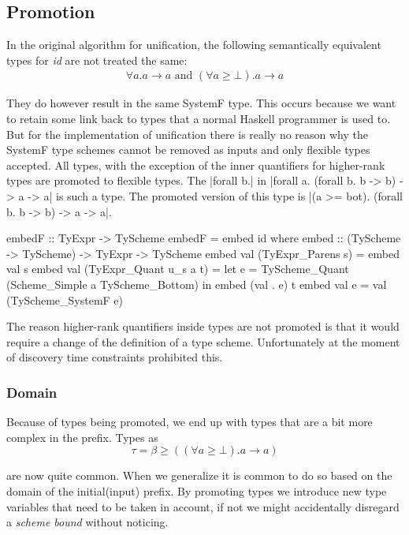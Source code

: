 \subsection{Promotion}
In the original algorithm for unification, the following semantically equivalent types for \emph{id} are not treated the same:
\begin{eqnarray*}
\forall a. a \rightarrow a \textrm{ and }
(\forall a \geq \bot). a \rightarrow a
\end{eqnarray*}

They do however result in the same SystemF type. This occurs because we want to retain some link back to types that a normal Haskell programmer is used to. But for the implementation of unification there is really no reason why the SystemF type schemes cannot be removed as inputs and only flexible types accepted. All types, with the exception of the inner quantifiers for higher-rank types are promoted to flexible types. The |forall b.| in |forall a. (forall b. b -> b) -> a -> a| is such a type. The promoted version of this type is |(a >= bot). (forall b. b -> b) -> a -> a|.

\begin{code}
embedF :: TyExpr -> TyScheme
embedF = embed id
  where  embed :: (TyScheme -> TyScheme) -> TyExpr -> TyScheme
         embed val (TyExpr_Parens       s) = embed val s
         embed val (TyExpr_Quant  u_s a t) = 
           let e = TyScheme_Quant (Scheme_Simple a TyScheme_Bottom)
           in  embed (val . e) t
         embed val e                     = val (TyScheme_SystemF e)
\end{code}

The reason higher-rank quantifiers inside types are not promoted is that it would require a change of the definition of a type scheme. Unfortunately at the moment of discovery time constraints prohibited this.
\subsubsection{Domain}
Because of types being promoted, we end up with types that are a bit more complex in the prefix. Types as 
\begin{equation}
\tau = \beta \geq ((\forall a \geq \bot). a \rightarrow a)
\end{equation}

are now quite common. When we generalize it is common to do so based on the domain of the initial(input) prefix. By promoting types we introduce new type variables that need to be taken in account, if not we might accidentally disregard a \emph{scheme bound} without noticing. 

